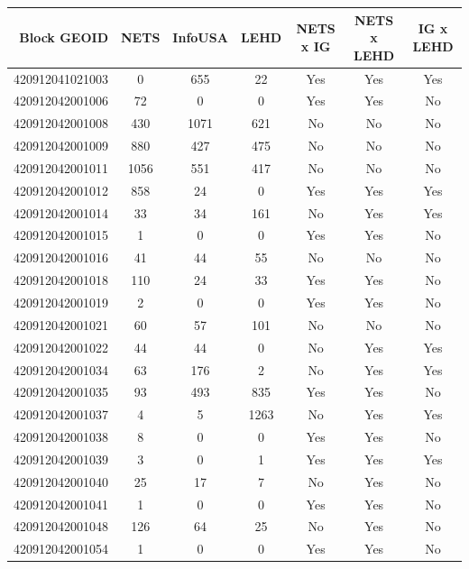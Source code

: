 \documentclass[paper = letter, fontsize = 11pt]{scrartcl}
\begin{document}
\clearpage
\pagestyle{empty}
\begin{table}
	\begin{center}
		\begin{tabular}{ r | c c c c c c }
			Block GEOID & NETS & InfoUSA & LEHD & NETS x IG & NETS x LEHD & IG x LEHD \\
			\hline
			\hline
			420912041021003 & 0 & 655 & 22 & Yes & Yes & Yes \\
			\hline 
			420912042001006 & 72 & 0 & 0 & Yes & Yes & No \\
			\hline 
			420912042001008 & 430 & 1071 & 621 & No & No & No \\
			\hline 
			420912042001009 & 880 & 427 & 475 & No & No & No \\
			\hline 
			420912042001011 & 1056 & 551 & 417 & No & No & No \\
			\hline 
			420912042001012 & 858 & 24 & 0 & Yes & Yes & Yes \\
			\hline 
			420912042001014 & 33 & 34 & 161 & No & Yes & Yes \\
			\hline 
			420912042001015 & 1 & 0 & 0 & Yes & Yes & No \\
			\hline 
			420912042001016 & 41 & 44 & 55 & No & No & No \\
			\hline 
			420912042001018 & 110 & 24 & 33 & Yes & Yes & No \\
			\hline 
			420912042001019 & 2 & 0 & 0 & Yes & Yes & No \\
			\hline 
			420912042001021 & 60 & 57 & 101 & No & No & No \\
			\hline 
			420912042001022 & 44 & 44 & 0 & No & Yes & Yes \\
			\hline 
			420912042001034 & 63 & 176 & 2 & No & Yes & Yes \\
			\hline 
			420912042001035 & 93 & 493 & 835 & Yes & Yes & No \\
			\hline 
			420912042001037 & 4 & 5 & 1263 & No & Yes & Yes \\
			\hline 
			420912042001038 & 8 & 0 & 0 & Yes & Yes & No \\
			\hline 
			420912042001039 & 3 & 0 & 1 & Yes & Yes & Yes \\
			\hline 
			420912042001040 & 25 & 17 & 7 & No & Yes & No \\
			\hline 
			420912042001041 & 1 & 0 & 0 & Yes & Yes & No \\
			\hline 
			420912042001048 & 126 & 64 & 25 & No & Yes & No \\
			\hline 
			420912042001054 & 1 & 0 & 0 & Yes & Yes & No \\

\end{tabular}
\end{center}
\end{table}
\end{document}
